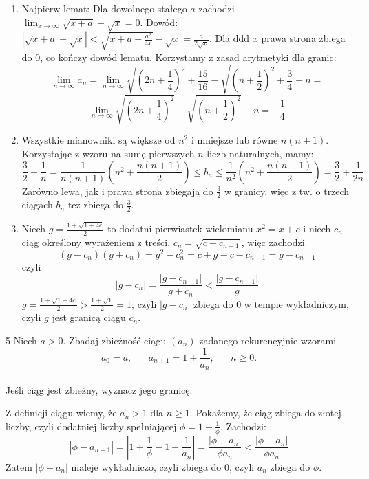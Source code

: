 \documentclass{../note}
\begin{document}
\begin{rozwiazanie}
\begin{enumerate}[label=(\alph*)]
    \item Najpierw lemat: Dla dowolnego stałego $a$ zachodzi $\lim_{x\rightarrow\infty}\sqrt{x + a} - \sqrt{x} = 0$. Dowód: $|\sqrt{x + a} - \sqrt{x}| < \sqrt{x + a + \frac{a^2}{4x}} - \sqrt{x} = \frac{a}{2\sqrt{x}}$. Dla ddd $x$ prawa strona zbiega do 0, co kończy dowód lematu. Korzystamy z zasad arytmetyki dla granic:
    \[\lim_{n\rightarrow\infty} a_n = \lim_{n\rightarrow\infty} \sqrt{\left(2n+\frac14\right)^2+\frac{15}{16}}-\sqrt{\left(n+\frac12\right)^2+\frac34}-n=\]
    \[\lim_{n\rightarrow\infty} \sqrt{\left(2n+\frac14\right)^2}-\sqrt{\left(n+\frac12\right)^2}-n = -\frac14\]
    \item Wszystkie mianowniki są większe od $n^2$ i mniejsze lub równe $n(n+1)$. Korzystając z wzoru na sumę pierwszych $n$ liczb naturalnych, mamy:
    \[\frac32 - \frac1n = \frac{1}{n(n+1)}\left(n^2 + \frac{n(n+1)}{2}\right) \leq b_n \leq \frac{1}{n^2}\left(n^2 + \frac{n(n+1)}{2}\right) = \frac32 + \frac{1}{2n}\]
    Zarówno lewa, jak i prawa strona zbiegają do $\frac32$ w granicy, więc z tw. o trzech ciągach $b_n$ też zbiega do $\frac32$.
    \item Niech $g = \frac{1+\sqrt{1+4c}}{2}$ to dodatni pierwiastek wielomianu $x^2=x+c$ i niech $c_n$ ciąg określony wyrażeniem z treści. $c_n = \sqrt{c + c_{n-1}}$, więc zachodzi 
    \[(g-c_n)(g+c_n) = g^2 - c_n^2 = c + g - c - c_{n-1} = g - c_{n-1}\]
    czyli
    \[|g-c_n| = \frac{|g - c_{n-1}|}{g+c_n} < \frac{|g - c_{n-1}|}{g}\]
    $g = \frac{1+\sqrt{1+4c}}{2} > \frac{1+\sqrt{1}}{2} = 1$, czyli $|g-c_n|$ zbiega do 0 w tempie wykładniczym, czyli $g$ jest granicą ciągu $c_n$.
\end{enumerate}
\end{rozwiazanie}
\begin{zadanie}{5}
Niech $a>0$. Zbadaj zbieżność ciągu $(a_{n})$ zadanego rekurencyjnie wzorami
\[a_{0}=a, \hspace{20pt} a_{n+1}=1+\frac{1}{a_{n}}, \hspace{20pt} n\ge0.\] \\
Jeśli ciąg jest zbieżny, wyznacz jego granicę.
\end{zadanie}
\begin{rozwiazanie}
Z definicji ciągu wiemy, że $a_n > 1$ dla $n \geq 1$. Pokażemy, że ciąg zbiega do złotej liczby, czyli dodatniej liczby spełniającej $\phi = 1 + \frac1\phi$. Zachodzi:
\[|\phi - a_{n+1}| = \left|1 + \frac1\phi - 1 - \frac1{a_n}\right| = \frac{|\phi - a_n|}{\phi a_n} < \frac{|\phi - a_n|}{\phi a_n}\]
Zatem $|\phi - a_n|$ maleje wykładniczo, czyli zbiega do 0, czyli $a_n$ zbiega do $\phi$.
\end{rozwiazanie}
\end{document}
